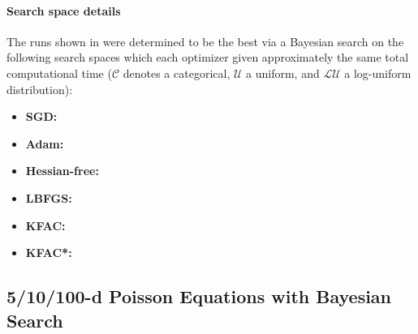 \paragraph{Search space details} The runs shown in  were determined to be the best via a Bayesian search on the following search spaces which each optimizer given approximately the same total computational time ($\mathcal{C}$ denotes a categorical, $\mathcal{U}$ a uniform, and $\mathcal{LU}$ a log-uniform distribution):
\begin{itemize}
  \def\pathToRuns{../kfac_pinns_exp/exp21_poisson_10d/tex/}
\item \textbf{SGD:} 
\item \textbf{Adam:} 
\item \textbf{Hessian-free:} 
\item \textbf{LBFGS:} 
\item \textbf{KFAC:} 
\item \textbf{KFAC*:} 
\end{itemize}

\subsection{5/10/100-d Poisson Equations with Bayesian Search}\label{sec:high-dimensional-poissons-app}

